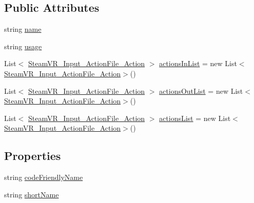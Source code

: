 \subsection*{Public Attributes}
\begin{DoxyCompactItemize}
\item 
string \mbox{\hyperlink{class_valve_1_1_v_r_1_1_steam_v_r___input___action_file___action_set_ae074781c069d0f0b46dfd815857dbd9c}{name}}
\item 
string \mbox{\hyperlink{class_valve_1_1_v_r_1_1_steam_v_r___input___action_file___action_set_a7905e6ae8aa3771750a77477d180bfb5}{usage}}
\item 
List$<$ \mbox{\hyperlink{class_valve_1_1_v_r_1_1_steam_v_r___input___action_file___action}{Steam\+V\+R\+\_\+\+Input\+\_\+\+Action\+File\+\_\+\+Action}} $>$ \mbox{\hyperlink{class_valve_1_1_v_r_1_1_steam_v_r___input___action_file___action_set_a711c009f1077a71af8b5c2d23750c9e9}{actions\+In\+List}} = new List$<$\mbox{\hyperlink{class_valve_1_1_v_r_1_1_steam_v_r___input___action_file___action}{Steam\+V\+R\+\_\+\+Input\+\_\+\+Action\+File\+\_\+\+Action}}$>$()
\item 
List$<$ \mbox{\hyperlink{class_valve_1_1_v_r_1_1_steam_v_r___input___action_file___action}{Steam\+V\+R\+\_\+\+Input\+\_\+\+Action\+File\+\_\+\+Action}} $>$ \mbox{\hyperlink{class_valve_1_1_v_r_1_1_steam_v_r___input___action_file___action_set_ad75502966a89e0263e38313ac6021224}{actions\+Out\+List}} = new List$<$\mbox{\hyperlink{class_valve_1_1_v_r_1_1_steam_v_r___input___action_file___action}{Steam\+V\+R\+\_\+\+Input\+\_\+\+Action\+File\+\_\+\+Action}}$>$()
\item 
List$<$ \mbox{\hyperlink{class_valve_1_1_v_r_1_1_steam_v_r___input___action_file___action}{Steam\+V\+R\+\_\+\+Input\+\_\+\+Action\+File\+\_\+\+Action}} $>$ \mbox{\hyperlink{class_valve_1_1_v_r_1_1_steam_v_r___input___action_file___action_set_a83c1dfb62684c0f77455e2f82f4d3dba}{actions\+List}} = new List$<$\mbox{\hyperlink{class_valve_1_1_v_r_1_1_steam_v_r___input___action_file___action}{Steam\+V\+R\+\_\+\+Input\+\_\+\+Action\+File\+\_\+\+Action}}$>$()
\end{DoxyCompactItemize}
\subsection*{Properties}
\begin{DoxyCompactItemize}
\item 
string \mbox{\hyperlink{class_valve_1_1_v_r_1_1_steam_v_r___input___action_file___action_set_a3aacef65c851bd2806f3661e411a9348}{code\+Friendly\+Name}}
\item 
string \mbox{\hyperlink{class_valve_1_1_v_r_1_1_steam_v_r___input___action_file___action_set_a69d2b8a84920be81664451a426e6f59e}{short\+Name}}
\end{DoxyCompactItemize}


